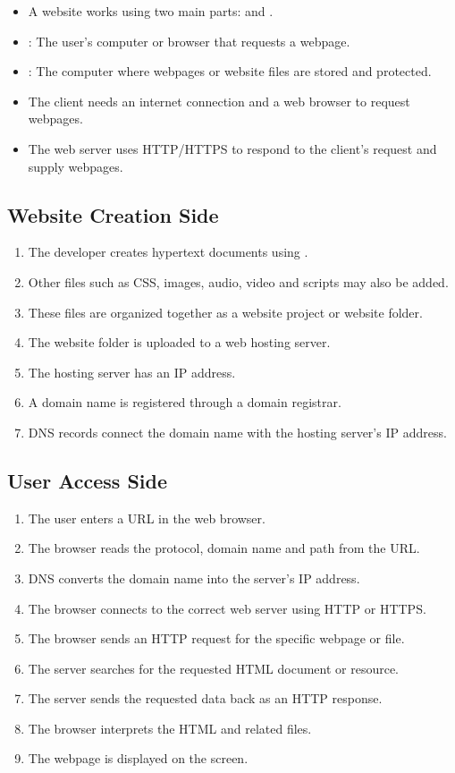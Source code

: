\begin{itemize}
    \item A website works using two main parts:  and .
    \item {}: The user's computer or browser that requests a webpage.
    \item {}: The computer where webpages or website files are stored and protected.
    \item The client needs an internet connection and a web browser to request webpages.
    \item The web server uses HTTP/HTTPS to respond to the client's request and supply webpages.
\end{itemize}

\subsection{Website Creation Side}

\begin{enumerate}
    \item The developer creates hypertext documents using .
    \item Other files such as CSS, images, audio, video and scripts may also be added.
    \item These files are organized together as a website project or website folder.
    \item The website folder is uploaded to a web hosting server.
    \item The hosting server has an IP address.
    \item A domain name is registered through a domain registrar.
    \item DNS records connect the domain name with the hosting server's IP address.
\end{enumerate}

\subsection{User Access Side}

\begin{enumerate}
    \item The user enters a URL in the web browser.
    \item The browser reads the protocol, domain name and path from the URL.
    \item DNS converts the domain name into the server's IP address.
    \item The browser connects to the correct web server using HTTP or HTTPS.
    \item The browser sends an HTTP request for the specific webpage or file.
    \item The server searches for the requested HTML document or resource.
    \item The server sends the requested data back as an HTTP response.
    \item The browser interprets the HTML and related files.
    \item The webpage is displayed on the screen.
\end{enumerate}

